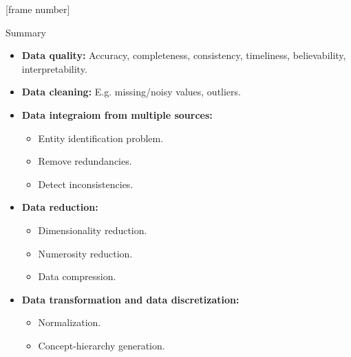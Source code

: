 \documentclass[aspectratio=169,t]{beamer}
\begin{document}
  {
    [frame number]
    \begin{frame}{Summary}
      \begin{itemize}
        \item \textbf{Data quality:} Accuracy, completeness, consistency, timeliness, believability, interpretability.
        \item \textbf{Data cleaning:} E.g. missing/noisy values, outliers.
        \item \textbf{Data integraiom from multiple sources:}
        \begin{itemize}
          \item Entity identification problem.
          \item Remove redundancies.
          \item Detect inconsistencies.
        \end{itemize}
        \item \textbf{Data reduction:}
        \begin{itemize}
          \item Dimensionality reduction.
          \item Numerosity reduction.
          \item Data compression.
        \end{itemize}
        \item \textbf{Data transformation and data discretization:}
        \begin{itemize}
          \item Normalization.
          \item Concept-hierarchy generation.
        \end{itemize}
      \end{itemize}
    \end{frame}
  }
\end{document}
